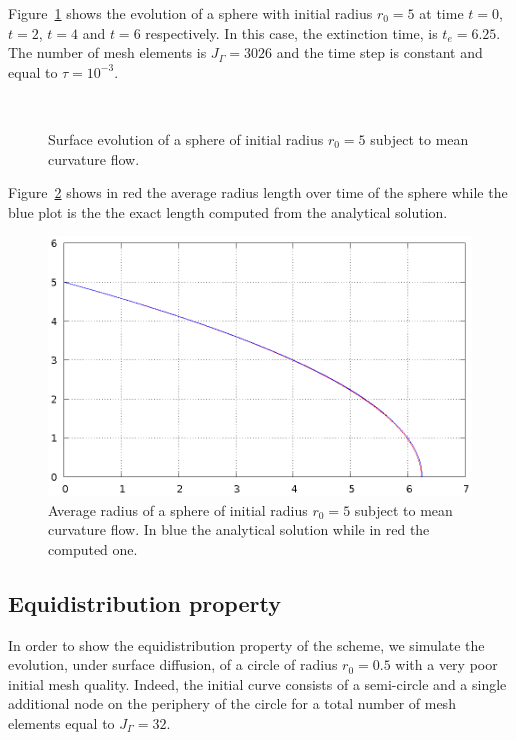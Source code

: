 Figure~\ref{fig:mcf_sphere} shows the evolution of a sphere with initial radius
$r_0=5$ at time $t=0$, $t=2$, $t=4$ and $t=6$ respectively. In this case, the
extinction time, is $t_e=6.25$. The number of mesh elements is $J_\Gamma=3026$
and the time step is constant and equal to $\tau=10^{-3}$.

\begin{figure}[htbp]
\centering
{}
\\
\caption[Mean curvature flow shrinking sphere]{Surface evolution of a sphere of
initial radius $r_0=5$ subject to mean curvature flow.}
\label{fig:mcf_sphere}
\end{figure}

Figure~\ref{fig:mcf_sphere_radius} shows in red the average radius length
over time of the sphere while the blue plot is the the exact length computed
from the analytical solution.

\begin{figure}[htbp]
\centering
\includegraphics[width=.45\textwidth]
{figures/geometric_pdes/mcf_sphere_radius.ps}
\caption[Mean curvature flow shrinking sphere radius]{Average radius of a
sphere of initial radius $r_0=5$ subject to mean curvature flow. In blue the
analytical solution while in red the computed one.}
\label{fig:mcf_sphere_radius}
\end{figure}

\subsection{Equidistribution property}\label{subsec:sd_circle}
In order to show the equidistribution property of the scheme, we simulate the
evolution, under surface diffusion, of a circle of radius $r_0=0.5$ with a very
poor initial mesh quality. Indeed, the initial curve consists of a semi-circle
and a single additional node on the periphery of the circle for a total number
of mesh elements equal to $J_\Gamma=32$.

